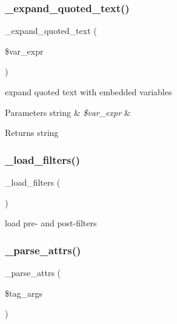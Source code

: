 \subsubsection{\texorpdfstring{\+\_\+expand\+\_\+quoted\+\_\+text()}{\_expand\_quoted\_text()}}
{\footnotesize\ttfamily \+\_\+expand\+\_\+quoted\+\_\+text (\begin{DoxyParamCaption}\item[{}]{\$var\+\_\+expr }\end{DoxyParamCaption})}

expand quoted text with embedded variables


\begin{DoxyParams}[1]{Parameters}
string & {\em \$var\+\_\+expr} & \\
\hline
\end{DoxyParams}
\begin{DoxyReturn}{Returns}
string 
\end{DoxyReturn}
\mbox{\label{class_smarty___compiler_a78b7b3c8ce574b2dcfcbd48070061740}} 
\subsubsection{\texorpdfstring{\+\_\+load\+\_\+filters()}{\_load\_filters()}}
{\footnotesize\ttfamily \+\_\+load\+\_\+filters (\begin{DoxyParamCaption}{ }\end{DoxyParamCaption})}

load pre-\/ and post-\/filters \mbox{\label{class_smarty___compiler_a226e4f37cafc2d535b3ea7ccad565d6a}} 
\subsubsection{\texorpdfstring{\+\_\+parse\+\_\+attrs()}{\_parse\_attrs()}}
{\footnotesize\ttfamily \+\_\+parse\+\_\+attrs (\begin{DoxyParamCaption}\item[{}]{\$tag\+\_\+args }\end{DoxyParamCaption})}

